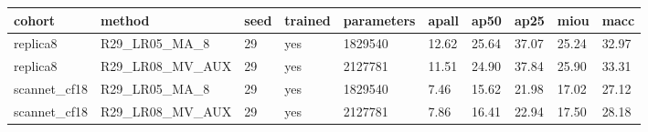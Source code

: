\begin{tabular}{llllllllll}
\toprule
cohort & method & seed & trained & parameters & apall & ap50 & ap25 & miou & macc \\
\midrule
replica8 & R29\_LR05\_MA\_8 & 29 & yes & 1829540 & 12.62 & 25.64 & 37.07 & 25.24 & 32.97 \\
replica8 & R29\_LR08\_MV\_AUX & 29 & yes & 2127781 & 11.51 & 24.90 & 37.84 & 25.90 & 33.31 \\
scannet\_cf18 & R29\_LR05\_MA\_8 & 29 & yes & 1829540 & 7.46 & 15.62 & 21.98 & 17.02 & 27.12 \\
scannet\_cf18 & R29\_LR08\_MV\_AUX & 29 & yes & 2127781 & 7.86 & 16.41 & 22.94 & 17.50 & 28.18 \\
\bottomrule
\end{tabular}
